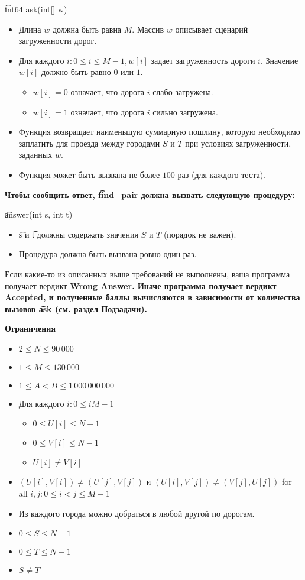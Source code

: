 \t{int64 ask(int[] w)}

\begin{itemize}
\item Длина $w$ должна быть равна $M.$ Массив $w$ описывает сценарий загруженности дорог.
\item Для каждого $i: 0 \le i \le M-1, w[i]$ задает загруженность дороги $i.$ Значение $w[i]$ должно быть равно $0$ или $1.$
\begin{itemize}
\item $w[i] = 0$ означает, что дорога $i$ слабо загружена.
\item $w[i] = 1$ означает, что дорога $i$ сильно загружена.
\end{itemize}
\item Функция возвращает наименьшую суммарную пошлину, которую необходимо заплатить для проезда между городами $S$ и $T$ при условиях загруженности, заданных $w.$
\item Функция может быть вызвана не более $100$ раз (для каждого теста).
\end{itemize}
\bf{}
Чтобы сообщить ответ, \t{find_pair} должна вызвать следующую процедуру:

\t{answer(int s, int t)}

\begin{itemize}
\item \t{s} и \t{t} должны содержать значения $S$ и $T$ (порядок не важен).
\item Процедура должна быть вызвана ровно один раз.
\end{itemize}

Если какие-то из описанных выше требований не выполнены, ваша программа получает вердикт \bf{Wrong Answer}. Иначе программа получает вердикт \bf{Accepted}, и полученные баллы вычисляются в зависимости от количества вызовов \t{ask} (см. раздел Подзадачи).

\bf{Ограничения}

\begin{itemize}
\item $2 \le N \le 90\,000$
\item $1 \le M \le 130\,000$
\item $1 \le A < B \le 1\,000\,000\,000$
\item Для каждого $i: 0 \le i M-1$
\begin{itemize}
\item $0 \le U[i] \le N-1$
\item $0 \le V[i] \le N-1$
\item $U[i] \neq V[i]$
\end{itemize}
\item $(U[i], V[i]) \neq (U[j], V[j])$ и $(U[i], V[j]) \neq (V[j], U[j])$ for all $i,j: 0 \le i < j \le M-1$
\item Из каждого города можно добраться в любой другой по дорогам.
\item $0 \le S \le N-1$
\item $0 \le T \le N-1$
\item $S \neq T$
\end{itemize}

